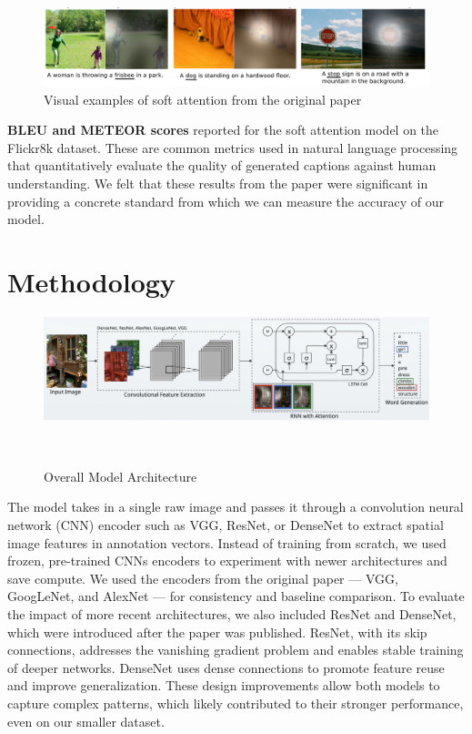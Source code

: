 \documentclass{article}
\begin{document}
\begin{figure}[h]
    \centering
    \includegraphics[width=0.9\linewidth]{chosen-results.png}
    \caption{Visual examples of soft attention from the original paper}
    \label{fig:results}
\end{figure}

\textbf{BLEU and METEOR scores} reported for the soft attention model on the Flickr8k dataset. These are common metrics used in natural language processing that quantitatively evaluate the quality of generated captions against human understanding. We felt that these results from the paper were significant in providing a concrete standard from which we can measure the accuracy of our model.


\section{Methodology}
\begin{figure}[h]
    \centering
    \includegraphics[scale=0.2]{methodology.png}
    \caption{Overall Model Architecture}
    \
\end{figure}
The model takes in a single raw image and passes it through a convolution neural network (CNN) encoder such as VGG, ResNet, or DenseNet to extract spatial image features in annotation vectors. Instead of training from scratch, we used frozen, pre-trained CNNs encoders to experiment with newer architectures and save compute. We used the encoders from the original paper --- VGG, GoogLeNet, and AlexNet --- for consistency and baseline comparison. To evaluate the impact of more recent architectures, we also included ResNet and DenseNet, which were introduced after the paper was published. ResNet, with its skip connections, addresses the vanishing gradient problem and enables stable training of deeper networks. DenseNet uses dense connections to promote feature reuse and improve generalization. These design improvements allow both models to capture complex patterns, which likely contributed to their stronger performance, even on our smaller dataset.
\end{document}
